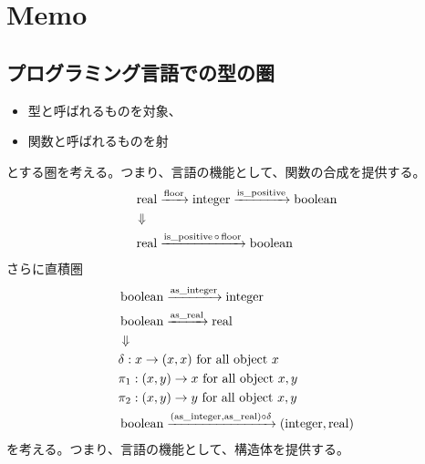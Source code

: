 \section{Memo}\label{sec:memorandom}
\newcommand{\rmapr}{M_{\mybf{R}}\mybf{R}}
\newcommand{\nmapr}{M_{\mybf{R}}\mybf{N}}
\newcommand{\zmapr}{M_{\mybf{R}}\mybf{Z}}
\newcommand{\loner}{L\mybf{R}}
\newcommand{\intallr}[1]{\int_{{#1}\in\mybf{R}}}

\newcommand{\sgraph}{\entrymodifiers={++[o][F-]}\xymatrix@R=1pt@C-1pc}

\subsection{プログラミング言語での型の圏}
\begin{itemize}
	\item 型と呼ばれるものを対象、
	\item 関数と呼ばれるものを射
\end{itemize}
とする圏を考える。つまり、言語の機能として、関数の合成を提供する。
\begin{equation}\begin{split}
	& \operatorname{real} \xrightarrow{\operatorname{floor}} \operatorname{integer} \xrightarrow{\operatorname{is\_positive}} \operatorname{boolean} \\
	& \Downarrow \\
	& \operatorname{real} \xrightarrow{\operatorname{is\_positive}\circ\operatorname{floor}} \operatorname{boolean} \\
\end{split}\end{equation}
さらに直積圏
\begin{equation}\begin{split}
	& \operatorname{boolean} \xrightarrow{\operatorname{as\_integer}} \operatorname{integer} \\
	& \operatorname{boolean} \xrightarrow{\operatorname{as\_real}} \operatorname{real} \\
	& \Downarrow \\
	& \delta: x \to (x, x) \text{ for all object } x \\
	& \pi_1: (x, y) \to x \text{ for all object } x, y \\
	& \pi_2: (x, y) \to y \text{ for all object } x, y \\
	& \operatorname{boolean} \xrightarrow{(\operatorname{as\_integer}, \operatorname{as\_real})\circ\delta} (\operatorname{integer}, \operatorname{real}) \\
\end{split}\end{equation}
を考える。つまり、言語の機能として、構造体を提供する。

